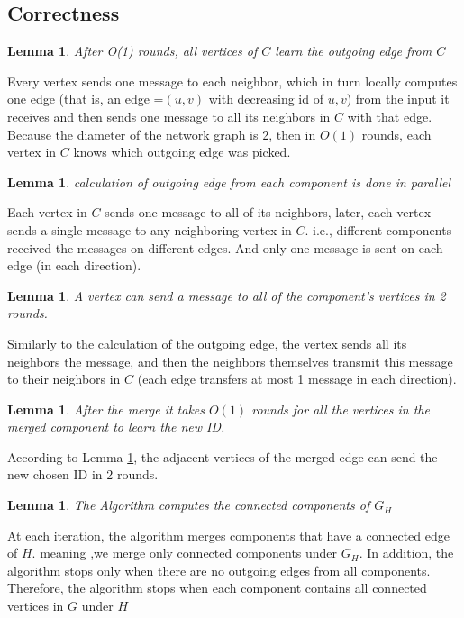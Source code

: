 \documentclass[11pt]{article}
\newtheorem{lemma}[theorem]{Lemma}
\begin{document}
\subsection*{Correctness}
\begin{lemma}
After O(1) rounds, all vertices of $C$ learn the outgoing edge from $C$ 
\end{lemma}
Every vertex sends one message to each neighbor, which in turn locally computes one edge (that is, an edge =$(u,v)$ with decreasing id of $u,v$) from the input it receives and then sends one message to all its neighbors in $C$ with that edge.
Because the diameter of the network graph is 2, then in $O(1)$ rounds, each vertex in $C$ knows which outgoing edge was picked.

\begin{lemma}
calculation of outgoing edge from each component is done in parallel
\end{lemma}
Each vertex in $C$ sends one message to all of its neighbors, later, each vertex sends a single message to any neighboring vertex in $C$. i.e., different components received the messages on different edges. And only one message is sent on each edge (in each direction). 

\begin{lemma}
\label{message_transfer_2_rounds}
A vertex can send a message to all of the component's vertices in 2 rounds.
\end{lemma}
Similarly to the calculation of the outgoing edge, the vertex sends all its neighbors the message, and then the neighbors themselves transmit this message to their neighbors in $C$ (each edge transfers at most 1 message in each direction).

\begin{lemma}
After the merge it takes $O(1)$ rounds for all the vertices in the merged component to learn the new ID.
\end{lemma}
According to Lemma \ref{message_transfer_2_rounds}, the adjacent vertices of the merged-edge can send the new chosen ID in 2 rounds.

\begin{lemma}
The Algorithm computes the connected components of $G_H$
\end{lemma}
At each iteration, the algorithm merges components that have a connected edge of $H$. meaning ,we merge only connected components under $G_H$. In addition, the algorithm stops only when there are no outgoing edges from all components. Therefore, the algorithm stops when each component contains all connected vertices in $G$ under $H$
\end{document}

